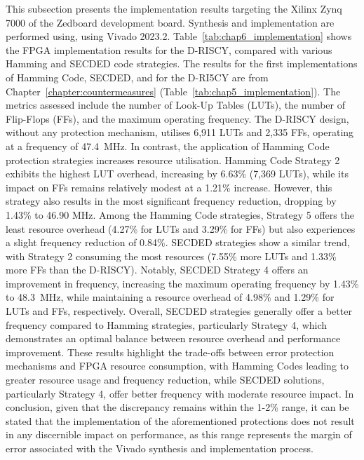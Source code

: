 This subsection presents the implementation results targeting the Xilinx Zynq 7000 of the Zedboard development board. Synthesis and implementation are performed using, using Vivado 2023.2.
Table~\ref{tab:chap6_implementation} shows the FPGA implementation results for the D-RISCY, compared with various Hamming and SECDED code strategies. The results for the first implementations of Hamming Code, SECDED, and for the D-RI5CY are from Chapter~\ref{chapter:countermeasures} (Table~\ref{tab:chap5_implementation}). The metrics assessed include the number of Look-Up Tables (LUTs), the number of Flip-Flops (FFs), and the maximum operating frequency. The D-RISCY design, without any protection mechanism, utilises 6,911 LUTs and 2,335 FFs, operating at a frequency of \SI{47.4}{\mega\hertz}. In contrast, the application of Hamming Code protection strategies increases resource utilisation. Hamming Code Strategy 2 exhibits the highest LUT overhead, increasing by 6.63\% (7,369 LUTs), while its impact on FFs remains relatively modest at a 1.21\% increase. However, this strategy also results in the most significant frequency reduction, dropping by 1.43\% to 46.90 MHz. Among the Hamming Code strategies, Strategy 5 offers the least resource overhead (4.27\% for LUTs and 3.29\% for FFs) but also experiences a slight frequency reduction of 0.84\%.
SECDED strategies show a similar trend, with Strategy 2 consuming the most resources (7.55\% more LUTs and 1.33\% more FFs than the D-RISCY). Notably, SECDED Strategy 4 offers an improvement in frequency, increasing the maximum operating frequency by 1.43\% to \SI{48.3}{\mega\hertz}, while maintaining a resource overhead of 4.98\% and 1.29\% for LUTs and FFs, respectively. Overall, SECDED strategies generally offer a better frequency compared to Hamming strategies, particularly Strategy 4, which demonstrates an optimal balance between resource overhead and performance improvement. These results highlight the trade-offs between error protection mechanisms and FPGA resource consumption, with Hamming Codes leading to greater resource usage and frequency reduction, while SECDED solutions, particularly Strategy 4, offer better frequency with moderate resource impact. In conclusion, given that the discrepancy remains within the 1-2\% range, it can be stated that the implementation of the aforementioned protections does not result in any discernible impact on performance, as this range represents the margin of error associated with the Vivado synthesis and implementation process.


